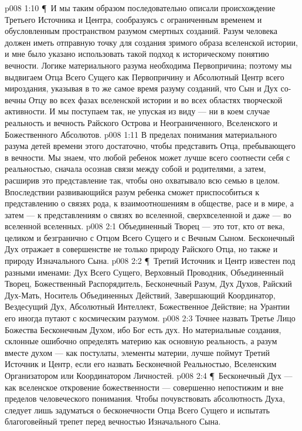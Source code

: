 \vs p008 1:10 \P\ И мы таким образом последовательно описали происхождение Третьего Источника и Центра, сообразуясь с ограниченным временем и обусловленным пространством разумом смертных созданий. Разум человека должен иметь отправную точку для создания зримого образа вселенской истории, и мне было указано использовать такой подход к историческому понятию вечности. Логике материального разума необходима Первопричина; поэтому мы выдвигаем Отца Всего Сущего как Первопричину и Абсолютный Центр всего мироздания, указывая в то же самое время разуму созданий, что Сын и Дух со\hyp{}вечны Отцу во всех фазах вселенской истории и во всех областях творческой активности. И мы поступаем так, не упуская из виду --- ни в коем случае реальность и вечность Райского Острова и Неограниченного, Вселенского и Божественного Абсолютов.
\vs p008 1:11 В пределах понимания материального разума детей времени этого достаточно, чтобы представить Отца, пребывающего в вечности. Мы знаем, что любой ребенок может лучше всего соотнести себя с реальностью, сначала осознав связи между собой и родителями, а затем, расширив это представление так, чтобы оно охватывало всю семью в целом. Впоследствии развивающийся разум ребенка сможет приспособиться к представлению о связях рода, к взаимоотношениям в обществе, расе и в мире, а затем --- к представлениям о связях во вселенной, сверхвселенной и даже --- во вселенной вселенных.
\vs p008 2:1 Объединенный Творец --- это тот, кто от века, целиком и безгранично с Отцом Всего Сущего и с Вечным Сыном. Бесконечный Дух отражает в совершенстве не только природу Райского Отца, но также и природу Изначального Сына.
\vs p008 2:2 \P\ Третий Источник и Центр известен под разными именами: Дух Всего Сущего, Верховный Проводник, Объединенный Творец, Божественный Распорядитель, Бесконечный Разум, Дух Духов, Райский Дух\hyp{}Мать, Носитель Объединенных Действий, Завершающий Координатор, Вездесущий Дух, Абсолютный Интеллект, Божественное Действие; на Урантии его иногда путают с космическим разумом.
\vs p008 2:3 Точнее назвать Третье Лицо Божества Бесконечным Духом, ибо Бог есть дух. Но материальные создания, склонные ошибочно определять материю как основную реальность, а разум вместе духом --- как постулаты, элементы материи, лучше поймут Третий Источник и Центр, если его назвать Бесконечной Реальностью, Вселенским Организатором или Координатором Личностей.
\vs p008 2:4 \P\ Бесконечный Дух --- как вселенское откровение божественности --- совершенно непостижим и вне пределов человеческого понимания. Чтобы почувствовать абсолютность Духа, следует лишь задуматься о бесконечности Отца Всего Сущего и испытать благоговейный трепет перед вечностью Изначального Сына.
